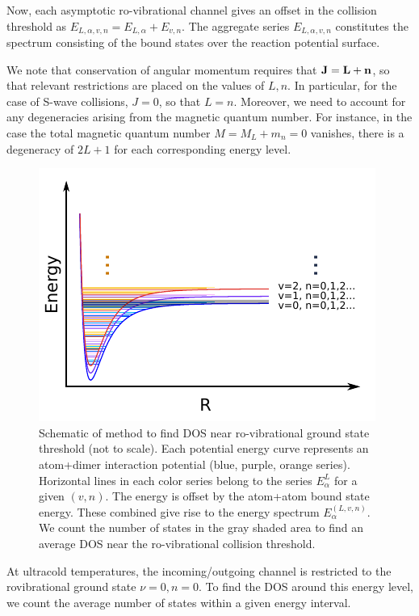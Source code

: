\documentclass[%
 reprint,
 amsmath,amssymb,
 aps,
 nofootinbib
]{revtex4-1}
\begin{document}
Now, each asymptotic ro-vibrational channel gives an offset in the collision threshold as $E_{L,\alpha,v,n} = E_{L,\alpha}+E_{v,n}$. The aggregate series $E_{L,\alpha,v,n}$ constitutes the spectrum consisting of the bound states over the reaction potential surface.

We note that conservation of angular momentum requires that $\mathbf{J}=\mathbf{L}+\mathbf{n}$, so that relevant restrictions are placed on the values of $L,n$. In particular, for the case of S-wave collisions, $J=0$, so that $L=n$. Moreover, we need to account for any degeneracies arising from the magnetic quantum number. For instance, in the case the total magnetic quantum number $M=M_L+m_n=0$ vanishes, there is a degeneracy of $2L+1$ for each corresponding energy level.

\begin{figure}
\includegraphics{figures/dos}
\caption{\label{fig:dos}Schematic of method to find DOS near ro-vibrational ground state threshold (not to scale). Each potential energy curve represents an atom+dimer interaction potential (blue, purple, orange series). Horizontal lines in each color series belong to the series $E_{\alpha}^L$ for a given $(v,n)$. The energy is offset by the atom+atom bound state energy. These combined give rise to the energy spectrum $E_\alpha^{(L,v,n)}$. We count the number of states in the gray shaded area to find an average DOS near the ro-vibrational collision threshold.}
\end{figure}


At ultracold temperatures, the incoming/outgoing channel is restricted to the rovibrational ground state $\nu = 0, n = 0$. To find the DOS around this energy level, we count the average number of states within a given energy interval.
\end{document}
